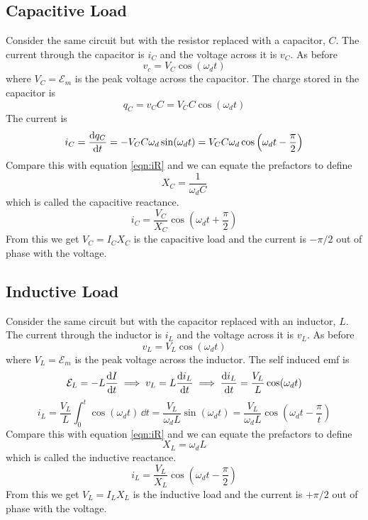 \documentclass{article}
\newcommand{\emf}{\mathcal{E}}
\begin{document}
    \subsection{Capacitive Load}
    Consider the same circuit but with the resistor replaced with a capacitor, \(C\).
    The current through the capacitor is \(i_C\) and the voltage across it is \(v_C\).
    As before
    \[v_c = V_C\cos(\omega_d t)\]
    where \(V_C = \emf_m\) is the peak voltage across the capacitor.
    The charge stored in the capacitor is
    \[q_C = v_CC = V_CC\cos(\omega_d t)\]
    The current is
    \[i_C = \dv{q_C}{t} = -V_CC\omega_d\sin(\omega_d t) = V_CC\omega_d\cos\left(\omega_d t - \frac{\pi}{2}\right)\]
    Compare this with equation \ref{eqn:iR} and we can equate the prefactors to define
    \[X_C = \frac{1}{\omega_dC}\]
    which is called the capacitive reactance.
    \[i_C = \frac{V_C}{X_C}\cos\left(\omega_d t + \frac{\pi}{2}\right)\]
    From this we get \(V_C = I_CX_C\) is the capacitive load and the current is \(-\pi/2\) out of phase with the voltage.
    
    \subsection{Inductive Load}
    Consider the same circuit but with the capacitor replaced with an inductor, \(L\).
    The current through the inductor is \(i_L\) and the voltage across it is \(v_L\).
    As before
    \[v_L = V_L\cos(\omega_d t)\]
    where \(V_L = \emf_m\) is the peak voltage across the inductor.
    The self induced emf is
    \[\emf_L = -L\dv{I}{t}\implies v_L = L\dv{i_L}{t}\implies \dv{i_L}{t} = \frac{V_L}{L}\cos(\omega_d t)\]
    \[i_L = \frac{V_L}{L}\int_{0}^{t}\cos(\omega_d t)\,\dd t = \frac{V_L}{\omega_d L}\sin(\omega_d t) = \frac{V_L}{\omega_d L}\cos\left(\omega_d t - \frac{\pi}{t}\right)\]
    Compare this with equation \ref{eqn:iR} and we can equate the prefactors to define
    \[X_L = \omega_d L\]
    which is called the inductive reactance.
    \[i_L = \frac{V_L}{X_L}\cos\left(\omega_d t - \frac{\pi}{2}\right)\]
    From this we get \(V_L = I_LX_L\) is the inductive load and the current is \(+\pi/2\) out of phase with the voltage.
    
\end{document}
